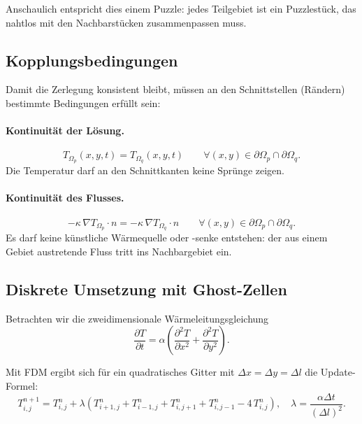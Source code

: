 Anschaulich entspricht dies einem Puzzle: 
jedes Teilgebiet ist ein Puzzlestück, das nahtlos mit den Nachbarstücken zusammenpassen muss.

\subsection{Kopplungsbedingungen}
Damit die Zerlegung konsistent bleibt, müssen an den Schnittstellen (Rändern) bestimmte Bedingungen erfüllt sein:

\paragraph{Kontinuität der Lösung.}
\begin{equation}
	T_{\Omega_p}(x,y,t) = T_{\Omega_q}(x,y,t)
	\qquad \forall (x,y) \in \partial \Omega_p \cap \partial \Omega_q.
\end{equation}
Die Temperatur darf an den Schnittkanten keine Sprünge zeigen.

\paragraph{Kontinuität des Flusses.}
\begin{equation}
	- \kappa \, \nabla T_{\Omega_p} \cdot n
	=
	- \kappa \, \nabla T_{\Omega_q} \cdot n
	\qquad \forall (x,y) \in \partial \Omega_p \cap \partial \Omega_q.
\end{equation}
Es darf keine künstliche Wärmequelle oder -senke entstehen: der aus einem Gebiet austretende Fluss tritt ins Nachbargebiet ein.

\subsection{Diskrete Umsetzung mit Ghost-Zellen}
Betrachten wir die zweidimensionale Wärmeleitungsgleichung
\begin{equation}
	\frac{\partial T}{\partial t} = 
	\alpha \left(
	\frac{\partial^2 T}{\partial x^2} + \frac{\partial^2 T}{\partial y^2}
	\right).
\end{equation}

Mit FDM ergibt sich für ein quadratisches Gitter mit $\Delta x=\Delta y=\Delta l$ die Update-Formel:
\begin{equation}
	T_{i,j}^{n+1}
	=
	T_{i,j}^{n}
	+
	\lambda \left(
	T_{i+1,j}^{n}+T_{i-1,j}^{n}+T_{i,j+1}^{n}+T_{i,j-1}^{n}-4\,T_{i,j}^{n}
	\right),
	\quad
	\lambda=\frac{\alpha\Delta t}{(\Delta l)^2}.
	\label{eq:update-dd}
\end{equation}

